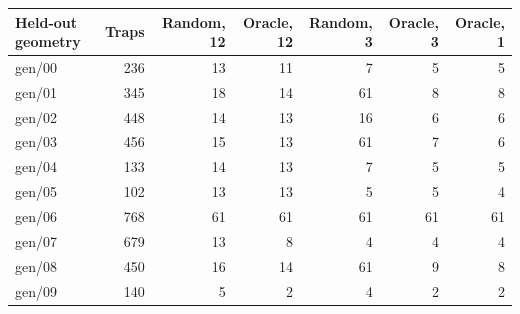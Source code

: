 \begin{tabular}{@{}lrrrrrr@{}}
\toprule
Held-out geometry & Traps & Random, 12 & Oracle, 12 & Random, 3 & Oracle, 3 & Oracle, 1 \\
\midrule
gen/00 & 236 & 13 & 11 & 7 & 5 & 5 \\
gen/01 & 345 & 18 & 14 & 61 & 8 & 8 \\
gen/02 & 448 & 14 & 13 & 16 & 6 & 6 \\
gen/03 & 456 & 15 & 13 & 61 & 7 & 6 \\
gen/04 & 133 & 14 & 13 & 7 & 5 & 5 \\
gen/05 & 102 & 13 & 13 & 5 & 5 & 4 \\
gen/06 & 768 & 61 & 61 & 61 & 61 & 61 \\
gen/07 & 679 & 13 & 8 & 4 & 4 & 4 \\
gen/08 & 450 & 16 & 14 & 61 & 9 & 8 \\
gen/09 & 140 & 5 & 2 & 4 & 2 & 2 \\
\bottomrule
\end{tabular}
